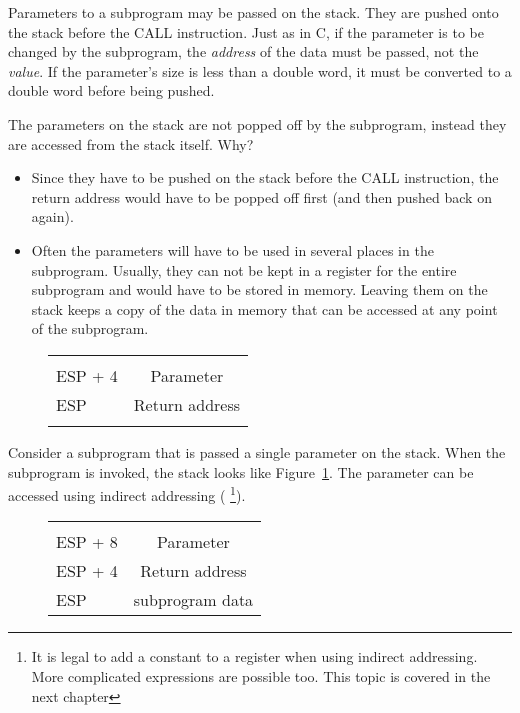 Parameters to a subprogram may be passed on the stack. They are pushed onto
the stack before the {\code CALL} instruction. Just as in C, if the
parameter is to be changed by the subprogram, the \emph{address} of the 
data must be passed, not the \emph{value}. If the parameter's size is less
than a double word, it must be converted to a double word before being pushed.

The parameters on the stack are not popped off by the subprogram, instead
they are accessed from the stack itself. Why?
\begin{itemize}
\item Since they have to be pushed on the stack before the {\code CALL}
instruction, the return address would have to be popped off first (and
then pushed back on again).
\item Often the parameters will have to be used in several places in the
subprogram. Usually, they can not be kept in a register for the entire
subprogram and would have to be stored in memory. Leaving them on the
stack keeps a copy of the data in memory that can be accessed at any
point of the subprogram.
\end{itemize}

\begin{figure}
\centering
\begin{tabular}{l|c|}
\cline{2-2}
&  \\ \cline{2-2}
ESP + 4 & Parameter \\ \cline{2-2}
ESP     & Return address \\ \cline{2-2}
 & \\ \cline{2-2}
\end{tabular}
\caption{}
\label{fig:stack1}
\end{figure}
Consider 
a subprogram that is passed a single parameter on the stack. When
the subprogram is invoked, the stack looks like Figure~\ref{fig:stack1}.
The parameter can be accessed using indirect addressing ({\code [ESP+4]}
\footnote{It is legal to add a constant to a register when using indirect
addressing. More complicated expressions are possible too. This topic is covered
in the next chapter}).
\begin{figure}
\centering
\begin{tabular}{l|c|}
\cline{2-2}
&  \\ \cline{2-2}
ESP + 8 & Parameter \\ \cline{2-2}
ESP + 4 & Return address \\ \cline{2-2}
ESP     & subprogram data \\ \cline{2-2}
\end{tabular}
\caption{}
\label{fig:stack2}
\end{figure}

